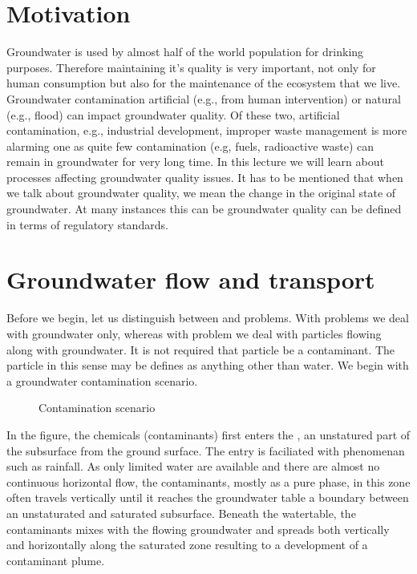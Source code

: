\documentclass[letterpaper,10pt,english]{jupyterBook}
\begin{document}
\section{Motivation}
\label{\detokenize{content/transport/L9/21_conservative_transport:motivation}}
\sphinxAtStartPar
Groundwater is used by almost half of the world population for drinking purposes. Therefore maintaining it’s quality is very important, not only for human consumption but also for the maintenance of the ecosystem that we live. Groundwater contamination artificial (e.g., from human intervention) or natural (e.g., flood) can impact groundwater quality. Of these two, artificial contamination, e.g., industrial development, improper waste management is more alarming one as quite few contamination (e.g, fuels, radioactive waste) can remain in groundwater for very long time. In this lecture we will learn about processes affecting groundwater quality issues. It has to be mentioned that when we talk about groundwater quality, we mean the change in the original state of groundwater. At many instances this can be groundwater quality can be defined in terms of regulatory standards.


\section{Groundwater flow and transport}
\label{\detokenize{content/transport/L9/21_conservative_transport:groundwater-flow-and-transport}}
\sphinxAtStartPar
Before we begin, let us distinguish between  and  problems. With  problems we deal with groundwater only, whereas with  problem we deal with particles flowing along with groundwater. It is not required that particle be a contaminant. The particle in this sense may be defines as anything other than water. We begin with a groundwater contamination scenario.

\begin{figure}[htbp]
\centering
\capstart

\noindent{}
\caption{Contamination scenario}\label{\detokenize{content/transport/L9/21_conservative_transport:trans-c-2d}}\end{figure}

\sphinxAtStartPar
In the figure, the chemicals (contaminants) first enters the , an unstatured part of the subsurface from the ground surface. The entry is faciliated with phenomenan such as rainfall. As only limited water are available and there are almost no continuous horizontal flow, the contaminants, mostly as a pure phase,  in this zone often travels vertically until it reaches the groundwater table \sphinxhyphen{} a boundary between an unstaturated and saturated subsurface. Beneath the water\sphinxhyphen{}table, the contaminants mixes with the flowing groundwater and spreads both vertically and horizontally along the saturated zone resulting to a development of a contaminant plume.
\end{document}
